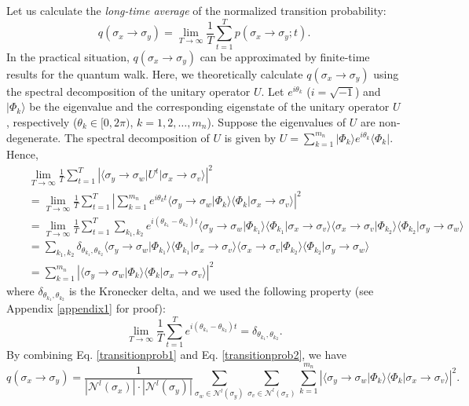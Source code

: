 \documentclass[10pt, letterpaper]{article}
\begin{document}
Let us calculate the \textit{long-time average} of the normalized transition probability:
\begin{equation} \label{longtimeprob}
q(\sigma_x\to\sigma_y) = \lim_{T\to\infty} \frac{1}{T} \sum_{t=1}^{T} p(\sigma_x\to\sigma_y; t).
\end{equation}
In the practical situation, $q(\sigma_x\to\sigma_y)$ can be approximated by finite-time results for the quantum walk. Here, we theoretically calculate $q(\sigma_x\to\sigma_y)$ using the spectral decomposition of the unitary operator $U$. Let $e^{i\theta_k}$ ($i=\sqrt{-1}$) and $\vert\Phi_k\rangle$ be the eigenvalue and the corresponding eigenstate of the unitary operator $U$, respectively ($\theta_k\in [0, 2\pi)$, $k=1,2,\ldots,m_n$). Suppose the eigenvalues of $U$ are non-degenerate. The spectral decomposition of $U$ is given by $U=\sum_{k=1}^{m_n} \vert\Phi_k\rangle e^{i\theta_k} \langle\Phi_k\vert$.
Hence,
\begin{eqnarray} \label{transitionprob2}
& & \lim_{T\to\infty} \frac{1}{T} \sum_{t=1}^{T} \left| \langle\sigma_y\to\sigma_w \vert U^{t} \vert \sigma_x\to\sigma_v\rangle \right|^2 \nonumber \\
& & = \lim_{T\to\infty} \frac{1}{T} \sum_{t=1}^{T} \left| \sum_{k=1}^{m_n} e^{i\theta_{k}t} \langle\sigma_y\to\sigma_w \vert \Phi_k\rangle \langle\Phi_k \vert \sigma_x\to\sigma_v\rangle \right|^2 \nonumber \\
& & = \lim_{T\to\infty} \frac{1}{T} \sum_{t=1}^{T} \sum_{k_1,k_2} e^{i(\theta_{k_1}-\theta_{k_2})t} \langle\sigma_y\to\sigma_w \vert \Phi_{k_1}\rangle \langle\Phi_{k_1} \vert \sigma_x\to\sigma_v\rangle \langle\sigma_x\to\sigma_v \vert \Phi_{k_2}\rangle \langle\Phi_{k_2} \vert \sigma_y\to\sigma_w\rangle \nonumber \\
& & = \sum_{k_1,k_2} \delta_{\theta_{k_1}, \theta_{k_2}} \langle\sigma_y\to\sigma_w \vert \Phi_{k_1}\rangle \langle\Phi_{k_1} \vert \sigma_x\to\sigma_v\rangle \langle\sigma_x\to\sigma_v \vert \Phi_{k_2}\rangle \langle\Phi_{k_2} \vert \sigma_y\to\sigma_w\rangle \nonumber \\
& & = \sum_{k=1}^{m_n} \left| \langle\sigma_y\to\sigma_w \vert \Phi_{k}\rangle \langle\Phi_{k} \vert \sigma_x\to\sigma_v\rangle \right|^2
\end{eqnarray}
where $\delta_{\theta_{k_1}, \theta_{k_2}}$ is the Kronecker delta, and we used the following property (see Appendix \ref{appendix1} for proof):
\begin{equation} \label{longtimeeigen}
\lim_{T\to\infty} \frac{1}{T} \sum_{t=1}^{T} e^{i(\theta_{k_1}-\theta_{k_2})t} = \delta_{\theta_{k_1}, \theta_{k_2}}.
\end{equation}
By combining Eq. \ref{transitionprob1} and Eq. \ref{transitionprob2}, we have
\begin{equation} \label{probtheory}
q(\sigma_x\to\sigma_y) = \frac{1}{\left|\mathcal{N}^{l}(\sigma_x)\right| \cdot \left|\mathcal{N}^{l}(\sigma_y)\right|} \sum_{\sigma_w\in \mathcal{N}^{l}(\sigma_y)} \sum_{\sigma_v\in \mathcal{N}^{l}(\sigma_x)} \sum_{k=1}^{m_n} \left| \langle\sigma_y\to\sigma_w \vert \Phi_{k}\rangle \langle\Phi_{k} \vert \sigma_x\to\sigma_v\rangle \right|^2.
\end{equation}
\end{document}
